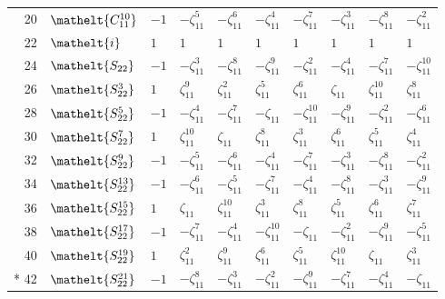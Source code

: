 \documentclass[10pt,a4paper]{article}
\numberwithin{equation}{section}
\newcommand{\eltfont}[1]{{\let\sigma\eltsigma\mathelt{#1}}}
\newcommand{\cls}[1]{\eltfont{#1}}
\newcommand{\rootunity}[1]{\zeta_{#1}}
\begin{document}
{\begin{longtable}{@{}rlllllllll@{}}
20 & $\cls{C_{11}^{10}}$ & $-1$ & $-\rootunity{11}^{5}$ & $-\rootunity{11}^{6}$ & $-\rootunity{11}^{4}$ & $-\rootunity{11}^{7}$ & $-\rootunity{11}^{3}$ & $-\rootunity{11}^{8}$ & $-\rootunity{11}^{2}$\\
22 & $\cls{i}$ & $1$ & $1$ & $1$ & $1$ & $1$ & $1$ & $1$ & $1$\\
24 & $\cls{S_{22}}$ & $-1$ & $-\rootunity{11}^{3}$ & $-\rootunity{11}^{8}$ & $-\rootunity{11}^{9}$ & $-\rootunity{11}^{2}$ & $-\rootunity{11}^{4}$ & $-\rootunity{11}^{7}$ & $-\rootunity{11}^{10}$\\
26 & $\cls{S_{22}^{3}}$ & $1$ & $\rootunity{11}^{9}$ & $\rootunity{11}^{2}$ & $\rootunity{11}^{5}$ & $\rootunity{11}^{6}$ & $\rootunity{11}$ & $\rootunity{11}^{10}$ & $\rootunity{11}^{8}$\\
28 & $\cls{S_{22}^{5}}$ & $-1$ & $-\rootunity{11}^{4}$ & $-\rootunity{11}^{7}$ & $-\rootunity{11}$ & $-\rootunity{11}^{10}$ & $-\rootunity{11}^{9}$ & $-\rootunity{11}^{2}$ & $-\rootunity{11}^{6}$\\
30 & $\cls{S_{22}^{7}}$ & $1$ & $\rootunity{11}^{10}$ & $\rootunity{11}$ & $\rootunity{11}^{8}$ & $\rootunity{11}^{3}$ & $\rootunity{11}^{6}$ & $\rootunity{11}^{5}$ & $\rootunity{11}^{4}$\\
32 & $\cls{S_{22}^{9}}$ & $-1$ & $-\rootunity{11}^{5}$ & $-\rootunity{11}^{6}$ & $-\rootunity{11}^{4}$ & $-\rootunity{11}^{7}$ & $-\rootunity{11}^{3}$ & $-\rootunity{11}^{8}$ & $-\rootunity{11}^{2}$\\
34 & $\cls{S_{22}^{13}}$ & $-1$ & $-\rootunity{11}^{6}$ & $-\rootunity{11}^{5}$ & $-\rootunity{11}^{7}$ & $-\rootunity{11}^{4}$ & $-\rootunity{11}^{8}$ & $-\rootunity{11}^{3}$ & $-\rootunity{11}^{9}$\\
36 & $\cls{S_{22}^{15}}$ & $1$ & $\rootunity{11}$ & $\rootunity{11}^{10}$ & $\rootunity{11}^{3}$ & $\rootunity{11}^{8}$ & $\rootunity{11}^{5}$ & $\rootunity{11}^{6}$ & $\rootunity{11}^{7}$\\
38 & $\cls{S_{22}^{17}}$ & $-1$ & $-\rootunity{11}^{7}$ & $-\rootunity{11}^{4}$ & $-\rootunity{11}^{10}$ & $-\rootunity{11}$ & $-\rootunity{11}^{2}$ & $-\rootunity{11}^{9}$ & $-\rootunity{11}^{5}$\\
40 & $\cls{S_{22}^{19}}$ & $1$ & $\rootunity{11}^{2}$ & $\rootunity{11}^{9}$ & $\rootunity{11}^{6}$ & $\rootunity{11}^{5}$ & $\rootunity{11}^{10}$ & $\rootunity{11}$ & $\rootunity{11}^{3}$\\*
42 & $\cls{S_{22}^{21}}$ & $-1$ & $-\rootunity{11}^{8}$ & $-\rootunity{11}^{3}$ & $-\rootunity{11}^{2}$ & $-\rootunity{11}^{9}$ & $-\rootunity{11}^{7}$ & $-\rootunity{11}^{4}$ & $-\rootunity{11}$\\
\bottomrule\end{longtable}}
\end{document}
